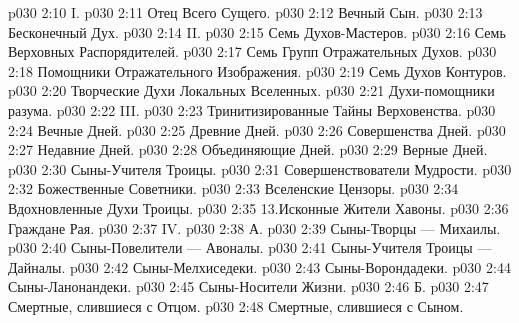 \vs p030 2:10 \pc I. 
\vs p030 2:11 \bibnobreakspace Отец Всего Сущего.
\vs p030 2:12 \bibnobreakspace Вечный Сын.
\vs p030 2:13 \bibnobreakspace Бесконечный Дух.
\vs p030 2:14 \pc II. 
\vs p030 2:15 \bibnobreakspace Семь Духов\hyp{}Мастеров.
\vs p030 2:16 \bibnobreakspace Семь Верховных Распорядителей.
\vs p030 2:17 \bibnobreakspace Семь Групп Отражательных Духов.
\vs p030 2:18 \bibnobreakspace Помощники Отражательного Изображения.
\vs p030 2:19 \bibnobreakspace Семь Духов Контуров.
\vs p030 2:20 \bibnobreakspace Творческие Духи Локальных Вселенных.
\vs p030 2:21 \bibnobreakspace Духи\hyp{}помощники разума.
\vs p030 2:22 \pc III. 
\vs p030 2:23 \bibnobreakspace Тринитизированные Тайны Верховенства.
\vs p030 2:24 \bibnobreakspace Вечные Дней.
\vs p030 2:25 \bibnobreakspace Древние Дней.
\vs p030 2:26 \bibnobreakspace Совершенства Дней.
\vs p030 2:27 \bibnobreakspace Недавние Дней.
\vs p030 2:28 \bibnobreakspace Объединяющие Дней.
\vs p030 2:29 \bibnobreakspace Верные Дней.
\vs p030 2:30 \bibnobreakspace Сыны\hyp{}Учителя Троицы.
\vs p030 2:31 \bibnobreakspace Совершенствователи Мудрости.
\vs p030 2:32 \bibnobreakspace Божественные Советники.
\vs p030 2:33 \bibnobreakspace Вселенские Цензоры.
\vs p030 2:34 \bibnobreakspace Вдохновленные Духи Троицы.
\vs p030 2:35 13.Исконные Жители Хавоны.
\vs p030 2:36 \bibnobreakspace Граждане Рая.
\vs p030 2:37 \pc IV. 
\vs p030 2:38 \pc А. 
\vs p030 2:39 \bibnobreakspace Сыны\hyp{}Творцы --- Михаилы.
\vs p030 2:40 \bibnobreakspace Сыны\hyp{}Повелители --- Авоналы.
\vs p030 2:41 \bibnobreakspace Сыны\hyp{}Учителя Троицы --- Дайналы.
\vs p030 2:42 \bibnobreakspace Сыны\hyp{}Мелхиседеки.
\vs p030 2:43 \bibnobreakspace Сыны\hyp{}Ворондадеки.
\vs p030 2:44 \bibnobreakspace Сыны\hyp{}Ланонандеки.
\vs p030 2:45 \bibnobreakspace Сыны\hyp{}Носители Жизни.
\vs p030 2:46 \pc Б. 
\vs p030 2:47 \bibnobreakspace Смертные, слившиеся с Отцом.
\vs p030 2:48 \bibnobreakspace Смертные, слившиеся с Сыном.
